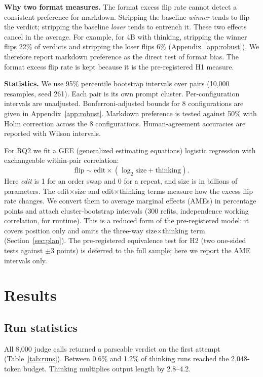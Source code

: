 \documentclass[10pt]{article}
\begin{document}
\textbf{Why two format measures.} The format excess flip rate cannot detect a consistent preference for
markdown. Stripping the baseline \emph{winner} tends to flip the verdict; stripping the baseline \emph{loser}
tends to entrench it. These two effects cancel in the average. For example, for 4B with thinking, stripping the
winner flips 22\% of verdicts and stripping the loser flips 6\% (Appendix~\ref{app:robust}). We therefore report
markdown preference as the direct test of format bias. The format excess flip rate is kept because it is the
pre-registered H1 measure.

\textbf{Statistics.} We use 95\% percentile bootstrap intervals over pairs (10{,}000 resamples, seed 261). Each
pair is its own prompt cluster. Per-configuration intervals are unadjusted. Bonferroni-adjusted bounds for 8
configurations are given in Appendix~\ref{app:robust}. Markdown preference is tested against 50\% with Holm
correction across the 8 configurations. Human-agreement accuracies are reported with Wilson intervals.

For RQ2 we fit a GEE (generalized estimating equations) logistic regression with exchangeable within-pair
correlation:
\[\text{flip} \sim \text{edit} \times (\log_2 \text{size} + \text{thinking}).\]
Here \emph{edit} is 1 for an order swap and 0 for a repeat, and size is in billions of parameters. The
edit$\times$size and edit$\times$thinking terms measure how the excess flip rate changes. We convert them to
average marginal effects (AMEs) in percentage points and attach cluster-bootstrap intervals (300 refits,
independence working correlation, for runtime). This is a reduced form of the pre-registered model: it covers
position only and omits the three-way size$\times$thinking term (Section~\ref{sec:plan}). The pre-registered
equivalence test for H2 (two one-sided tests against $\pm$3 points) is deferred to the full sample; here we report
the AME intervals only.

\section{Results}
\subsection{Run statistics}
All 8{,}000 judge calls returned a parseable verdict on the first attempt (Table~\ref{tab:runs}). Between 0.6\%
and 1.2\% of thinking runs reached the 2{,}048-token budget. Thinking multiplies output length by 2.8--4.2.
\end{document}
